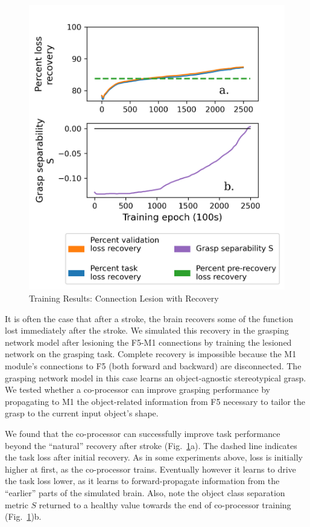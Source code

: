 \documentclass[12pt]{iopart}
\begin{document}
\begin{figure}[h]
\centering
\includegraphics[scale=1]{training_results_recov.png}
\caption{Training Results: Connection Lesion with Recovery}
\label{fig:results_recov}
\end{figure}

It is often the case that after a stroke, the brain recovers some of the function lost immediately after the
stroke. We simulated this recovery in the grasping network model after lesioning the F5-M1 connections by
training the lesioned network on the grasping task. Complete recovery is impossible because the M1 module's
connections to F5 (both forward and backward) are disconnected. The grasping network model in this case learns
an object-agnostic stereotypical grasp. We tested whether a co-processor can improve grasping performance by
propagating to M1 the object-related information from F5 necessary to tailor the grasp to the current
input object's shape.

We found that the co-processor can successfully improve task performance beyond the ``natural''
recovery after stroke (Fig.~\ref{fig:results_recov}a). The dashed line
indicates the task loss after initial recovery. As in some experiments above, loss is
initially higher at first, as the co-processor trains. Eventually however it learns
to drive the task loss lower, as it learns to forward-propagate information from the
``earlier'' parts of the simulated brain. Also, note the object class separation metric $S$
returned to a healthy value towards the end of co-processor training
(Fig.~\ref{fig:results_recov})b.
\end{document}
